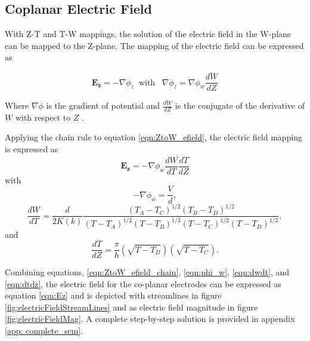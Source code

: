 \subsection{Coplanar Electric Field}

 \par With Z-T and T-W mappings, the solution of the electric field in the W-plane can be mapped to the Z-plane. The mapping of the electric field can be expressed as 
 
 \begin{equation}
     \boldsymbol{E_z} = -\nabla \phi_z \;\;\text{with} \;\;\;\nabla \phi_z = \nabla \phi_w \overline{\frac{dW}{dZ}}
     \label{eqn:ZtoW_efield}
 \end{equation}
 
 \noindent Where $\nabla \phi$ is the gradient of potential and $\overline{\frac{dW}{dZ}}$ is the conjugate of the derivative of $W$ with respect to $Z$ \cite{schinzinger_conformal_2012}.
 
 \par Applying the chain rule to equation \ref{eqn:ZtoW_efield}, the electric field mapping is expressed as
 \begin{equation}
    \boldsymbol{E_z} =- \nabla \phi_w \overline{\frac{dW}{dT}\frac{dT}{dZ}}
    \label{eqn:ZtoW_efield_chain}
 \end{equation}
\noindent with 
 \begin{equation}
     -\nabla \phi_w = \frac{V}{d},
     \label{eqn:phi_w}
 \end{equation}
 \begin{equation}
     \frac{dW}{dT} = \frac{d}{2K(k)}\frac{(T_A - T_C)^{1/2}(T_B-T_D)^{1/2}}{(T-T_A)^{1/2}(T-T_B)^{1/2}(T-T_C)^{1/2}(T-T_D)^{1/2}},
     \label{eqn:dwdt}
 \end{equation}
 \noindent and
 \begin{equation}
     \frac{dT}{dZ} = \frac{\pi}{h}(\sqrt{T-T_D})(\sqrt{T-T_C}).
     \label{eqn:dtdz}
 \end{equation}
 
 \par Combining equations, \ref{eqn:ZtoW_efield_chain}, \ref{eqn:phi_w}, \ref{eqn:dwdt}, and \ref{eqn:dtdz}, the electric field for the co-planar electrodes can be expressed as equation \ref{eqn:Ez} and is depicted with streamlines in figure \ref{fig:electricFieldStreamLines} and as electric field magnitude in figure \ref{fig:electricFieldMag}. A complete step-by-step solution is provided in appendix \ref{app: complete_scm}.
 
